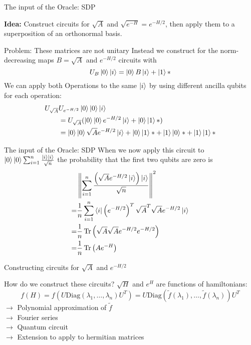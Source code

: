 \begin{frame}{The input of the Oracle: SDP}

\textbf{Idea: } Construct circuits for $\sqrt{A}$ and $\sqrt{e^{-H}}=e^{-H/2}$, then apply them to a superposition of an orthonormal basis.

\begin{block}{Problem: These matrices are not unitary}
Instead we construct for the norm-decreasing maps $B=\sqrt{A}$ and $e^{-H/2}$ circuits with
\begin{equation*}
U_B\ket{0}\ket{i}=\ket{0}B\ket{i}+\ket{1}*
\end{equation*}
We can apply both Operations to the same $\ket{i}$ by using different ancilla qubits for each operation:
\begin{align*}
U_{\sqrt{A}}&U_{e^{-H/2}}\ket{0}\ket{0}\ket{i}\\
&=U_{\sqrt{A}}(\ket{0}\ket{0}e^{-H/2}\ket{i}+\ket{0}\ket{1}*)\\
&=\ket{0}\ket{0}\sqrt{A}e^{-H/2}\ket{i}+\ket{0}\ket{1}*+\ket{1}\ket{0}*+\ket{1}\ket{1}*
\end{align*}
\end{block}

\end{frame}

\begin{frame}{The input of the Oracle: SDP}
When we now apply this circuit to $\ket{0}\ket{0}\sum_{i=1}^n \frac{\ket{i}\ket{i}}{\sqrt{n}}$ the probability that the first two qubits are zero is
\begin{align*}
&\left\|\sum_{i=1}^n\frac{\left(\sqrt{A}e^{-H/2}\ket{i}\right)\ket{i}}{\sqrt{n}}\right\|^2\\
=&\frac{1}{n}\sum_{i=1}^n \bra{i}\left(e^{-H/2}\right)^T\sqrt{A}^T\sqrt{A}e^{-H/2}\ket{i}\\
=&\frac{1}{n}\operatorname{Tr}\left(\sqrt{A}\sqrt{A}e^{-H/2}e^{-H/2}\right)\\
=&\frac{1}{n}\operatorname{Tr}\left(Ae^{-H}\right)
\end{align*}
\end{frame}

\begin{frame}{Constructing circuits for  $\sqrt{A}$ and $e^{-H/2}$}
\begin{block}{How do we construct these circuits?}
$\sqrt{H}$ and $e^{H}$ are functions of hamiltonians:
\begin{equation*}
f(H)=f(U \mathrm{Diag}(\lambda_1,\ldots, \lambda_n) U^T)=U \mathrm{Diag}(\tilde{f}(\lambda_1),\ldots,\tilde{f}(\lambda_n))U^T
\end{equation*}
$\to$ Polynomial approximation of $\tilde{f}$\\
$\to$ Fourier series \\
$\to$ Quantum circuit \\
$\to$ Extension to apply to hermitian matrices
\end{block}
\end{frame}

